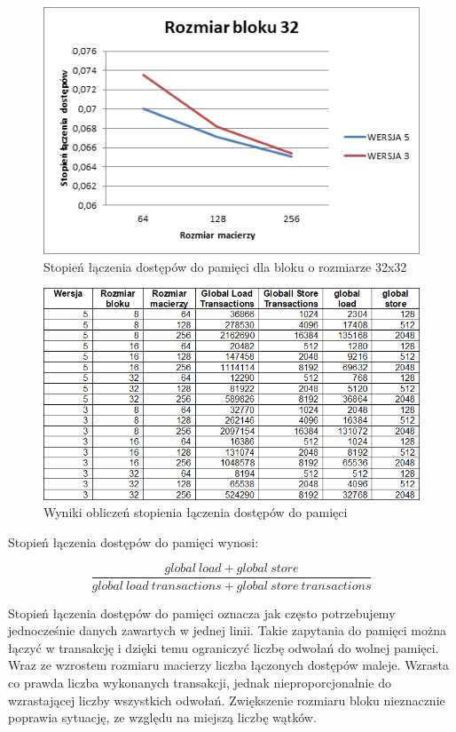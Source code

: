 \documentclass{article}
\begin{document}
\begin{figure}[H]
	\centering
	\includegraphics[width=\linewidth]{./images/graphs/dostepy/graph3.png}
	\caption{Stopień łączenia dostępów do pamięci dla bloku o rozmiarze 32x32}
	\label{fig:graphd3}
\end{figure}

\begin{figure}[H]
	\centering
	\includegraphics[width=\linewidth]{./images/tables/table1.png}
	\caption{Wyniki obliczeń stopienia łączenia dostępów do pamięci}
	\label{fig:table1}
\end{figure}

Stopień łączenia dostępów do pamięci wynosi:

\[
\frac{global\ load + global\ store}{global\ load\ transactions + global\ store\ transactions}
\]

Stopień łączenia dostępów do pamięci oznacza jak często potrzebujemy jednocześnie danych zawartych w jednej linii. Takie zapytania do pamięci można łączyć w transakcję i dzięki temu ograniczyć liczbę odwołań do wolnej pamięci. Wraz ze wzrostem rozmiaru macierzy liczba łączonych dostępów maleje. Wzrasta co prawda liczba wykonanych transakcji, jednak nieproporcjonalnie do wzrastającej liczby wszystkich odwołań. Zwiększenie rozmiaru bloku nieznacznie poprawia sytuację, ze względu na miejszą liczbę wątków.
\end{document}
